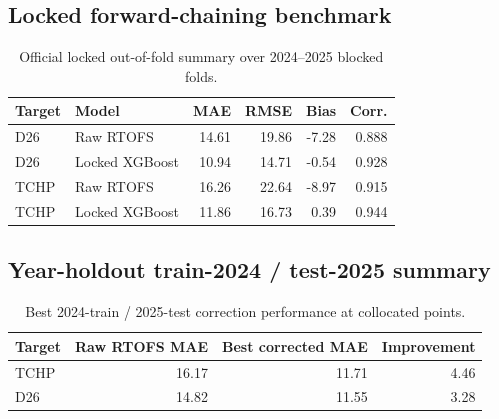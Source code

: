 \documentclass[11pt]{report}
\begin{document}
\subsection{Locked forward-chaining benchmark}
\begin{table}[H]
\centering
\begin{tabular}{llrrrr}
\toprule
Target & Model & MAE & RMSE & Bias & Corr. \\
\midrule
D26 & Raw RTOFS & 14.61 & 19.86 & -7.28 & 0.888 \\
D26 & Locked XGBoost & 10.94 & 14.71 & -0.54 & 0.928 \\
TCHP & Raw RTOFS & 16.26 & 22.64 & -8.97 & 0.915 \\
TCHP & Locked XGBoost & 11.86 & 16.73 & 0.39 & 0.944 \\
\bottomrule
\end{tabular}
\caption{Official locked out-of-fold summary over 2024--2025 blocked folds.}
\end{table}

\subsection{Year-holdout train-2024 / test-2025 summary}
\begin{table}[H]
\centering
\begin{tabular}{lrrr}
\toprule
Target & Raw RTOFS MAE & Best corrected MAE & Improvement \\
\midrule
TCHP & 16.17 & 11.71 & 4.46 \\
D26 & 14.82 & 11.55 & 3.28 \\
\bottomrule
\end{tabular}
\caption{Best 2024-train / 2025-test correction performance at collocated points.}
\end{table}
\end{document}
